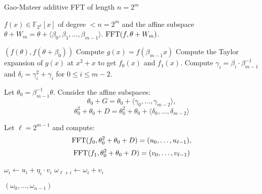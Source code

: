 \begin{algorithm}[h]
	\caption{Gao-Mateer additive FFT of length $n=2^m$}
	\label{Algo:Gao}
	\begin{algorithmic}[1]
		\Require $f(x) \in \mathbb{F}_{2^k}[x]$ of degree $< n = 2^m$ and the affine subspace $\theta+W_m=\theta+ \langle \beta_0,\beta_1,\ldots,\beta_{m-1} \rangle$.
		\Ensure $\operatorname{FFT}(f,\theta+W_m)$.
		
		\State \Return $(f(\theta), f(\theta+\beta_0))$ \label{line:gao-last_step_evaluation}
		\EndIf
		\State Compute $g(x) = f(\beta_{m-1} x)$ \label{STEP:GaoAlgo-g(x)}
		\State Compute the Taylor expansion of $g(x)$ at $x^2+x$ to get $f_0(x)$ and $f_1(x)$.
		\State Compute $\gamma_i = \beta_i \cdot \beta_{m-1}^{-1}$ and $\delta_i = \gamma_i^2 + \gamma_i$ for $0 \leq i \leq m - 2$.
		
		\State Let $\theta_0 = \beta_{m-1}^{-1} \theta$. Consider the affine subspaces:
		\[
		\theta_0+G=\theta_0+\langle \gamma_0, \ldots, \gamma_{m-2} \rangle, 
		\]
		\[
		\theta_0^2+\theta_0+D=\theta_0^2+\theta_0+\langle \delta_0, \ldots, \delta_{m-2} \rangle
		\]
		
		\State Let $\ell = 2^{m-1}$ and compute:
		\[
		\operatorname{FFT}(f_0, \theta_0^2+\theta_0+D) = (u_0, \ldots, u_{\ell-1}),
		\]
		\[
		\operatorname{FFT}(f_1, \theta_0^2+\theta_0+D) = (v_0, \ldots, v_{\ell-1})
		\]
		
		\State $\omega_i \gets u_i + \eta_i \cdot v_i$
		\State $\omega_{\ell+i} \gets \omega_i + v_i$ \label{STEP:GaoAlgo-wi}
		\EndFor
		
		\State \Return $(\omega_0, \ldots, \omega_{n-1})$
		
	\end{algorithmic}
\end{algorithm}

